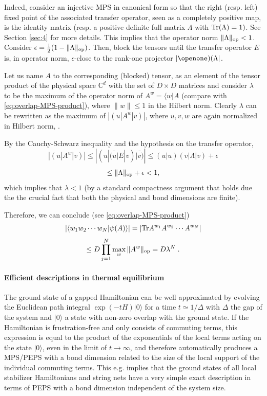 \documentclass[rmp,aps,reprint,superscriptaddress,nobalancelastpage]{revtex4-1}
\def\Id{{\openone}}
\newcommand{\bra}[1]{\langle#1\vert}
\begin{document}
Indeed, consider an injective MPS in canonical form so that the right (resp. left) fixed point of the associated transfer operator, seen as a completely positive map,  is the identity matrix (resp. a positive definite full matrix $\Lambda$ with ${\rm Tr}(\Lambda)=1)$. See Section \ref{sec:4} for more details. This implies that the operator norm  $\|\Lambda\|_{\rm op}<1$. Consider $\epsilon=\frac{1}{2}(1-\|\Lambda\|_{\rm op})$.
Then, block the tensors until the transfer operator $E$ is, in operator norm, $\epsilon$-close to the rank-one projector $|\Id)(\Lambda|$.

Let us name $A$ to the corresponding (blocked) tensor, as an element of the tensor product of the physical space $\mathbb{C}^d$ with the set of $D\times D$ matrices and consider $\lambda$ to be the maximum of  the operator norm of  $A^{w}=\bra{w}A$ (compare with \eqref{eq:overlap-MPS-product}), where $\|w\|\le 1$ in the Hilbert norm. Clearly $\lambda$ can be rewritten as the maximum of $|(u|A^w|v)|$, where $u,v,w$ are again normalized in Hilbert norm, .

By the Cauchy-Schwarz inequality and the hypothesis on the transfer operator,
$$|(u|A^{w}|v)|\le |(u|\bar{(u|}E|v)\bar{|v)}|\le (u|u)(v|\Lambda|v) +\epsilon $$
$$\le \|\Lambda\|_{\rm op}+\epsilon<1,$$
which implies that $\lambda<1$ (by a  standard compactness argument that holds due the the crucial fact that both the physical and bond dimensions are finite).


Therefore, we can conclude (see \eqref{eq:overlap-MPS-product})
$$|\langle w_1w_2\cdots w_N|\psi(A)\rangle|=|{\rm Tr}{A^{w_1}A^{w_2}\cdots A^{w_N}}|$$
$$\le D\prod_{j=1}^N\max_w\|A^w\|_{\rm op}= D\lambda^N\; .$$



\paragraph{Efficient descriptions in thermal equilibrium}

The ground state of a gapped Hamiltonian can be well approximated by evolving the Euclidean path integral $\exp(-tH)|0\rangle$ for a time $t\simeq 1/\Delta$ with $\Delta$ the gap of the system and $|0\rangle$ a state with non-zero overlap with the ground state. If the Hamiltonian is frustration-free and only consists of commuting terms, this expression is equal to the product of the exponentials of the local terms acting on the state $|0\rangle$, even in the limit of  $t\rightarrow\infty$, and therefore automatically produces a MPS/PEPS with a bond dimension related to the size of the local support of the individual commuting terms. This e.g. implies that the ground states of all  local stabilizer Hamiltonians and string nets have a very simple exact description in terms of PEPS with a bond dimension independent of the system size.
\end{document}
